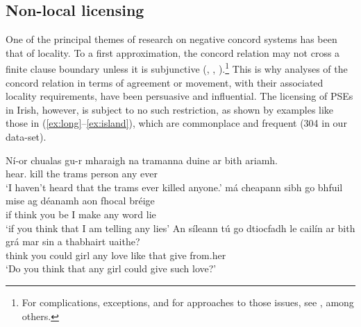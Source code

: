 \documentclass[output=paper,colorlinks,citecolor=brown]{langscibook}
\begin{document}
\subsection{Non-local licensing}
\label{sec:non-local}

One of the principal themes of research on negative concord systems has been that of locality.  To a first approximation, the concord relation may not cross a finite clause boundary unless it is subjunctive (\cite{haegeman-zanuttini:91}, \cite[43--45]{hedde:08}, \cite{deal:22}).\footnote{For complications, exceptions, and for approaches to those issues, see \citet{robinson-thoms:21}, among others.}  This is why analyses of the concord relation in terms of agreement or movement, with their associated locality requirements, have been persuasive and influential.  The licensing of PSEs in Irish, however, is subject to no such restriction, as shown by examples like those in (\ref{ex:long}--\ref{ex:island}), which are commonplace and frequent (304 in our data-set).

\ea\label{ex:long}
\ea
\gll Ní-or chualas gu-r mharaigh na tramanna duine {ar bith} ariamh. \\
     {\nior} {hear\past.\my} {\C\past} {kill\past} the trams person any ever \\
\glt `I haven't heard that the trams ever killed anyone.'
\ex
\gll má cheapann sibh go bhfuil mise ag déanamh aon fhocal bréige \\
     if {think\pres} {you\pl} {\C} {be\pres} I {\prog} {make\vn} any word {lie\gen} \\
\glt `if you think that I am telling any lies'
\ex
\gll An síleann tú go {dtiocfadh le} cailín {ar bith} grá mar sin a thabhairt uaithe? \\
    {\interr} {think\pres} you {\go} {could} girl any love like that {\vce} {give\vn} from.her \\
\glt `Do you think that any girl could give such love?'
\z
\z

\end{document}
